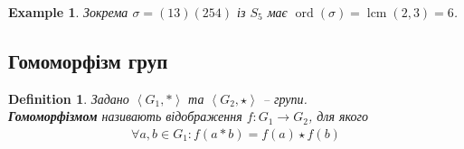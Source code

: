 \documentclass[a4paper, 10pt]{article}
\theoremstyle{theoremdd}
\theoremstyle{theoremdd}
\newtheorem{definition}[theorem]{Definition}
\theoremstyle{theoremdd}
\theoremstyle{theoremdd}
\theoremstyle{theoremdd}
\newtheorem{example}[theorem]{Example}
\theoremstyle{theoremdd}
\theoremstyle{theoremdd}
\theoremstyle{theoremdd}
\theoremstyle{theoremdd}
\theoremstyle{theoremdd}
\theoremstyle{theoremdd}
\theoremstyle{theoremdd}
\theoremstyle{theoremdd}
\theoremstyle{theoremdd}
\theoremstyle{theoremdd}
\DeclareMathOperator{\ord}{ord}
\DeclareMathOperator{\lcm}{lcm}
\begin{document}
\begin{example}
Зокрема $\sigma = (13) (254)$ із $S_5$ має $\ord(\sigma) = \lcm(2,3) = 6$.
\end{example}

\subsection{Гомоморфізм груп}
\begin{definition}
Задано $\left<G_1, * \right>$ та $\left<G_2, \star \right>$ -- групи.\\
\textbf{Гомоморфізмом} називають відображення $f \colon G_1 \to G_2$, для якого
\begin{align*}
\forall a,b \in G_1: f(a*b) = f(a) \star f(b)
\end{align*}
\end{definition}
\end{document}
